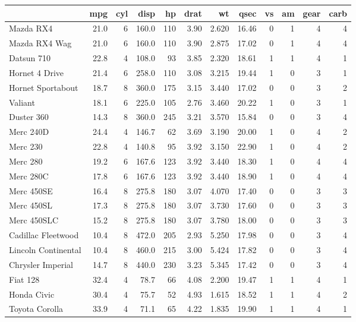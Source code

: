 \documentclass[
  letterpaper,
  DIV=11,
  numbers=noendperiod]{scrartcl}
\begin{document}
\begin{tabular}{l|r|r|r|r|r|r|r|r|r|r|r}
\hline
  & mpg & cyl & disp & hp & drat & wt & qsec & vs & am & gear & carb\\
\hline
Mazda RX4 & 21.0 & 6 & 160.0 & 110 & 3.90 & 2.620 & 16.46 & 0 & 1 & 4 & 4\\
\hline
Mazda RX4 Wag & 21.0 & 6 & 160.0 & 110 & 3.90 & 2.875 & 17.02 & 0 & 1 & 4 & 4\\
\hline
Datsun 710 & 22.8 & 4 & 108.0 & 93 & 3.85 & 2.320 & 18.61 & 1 & 1 & 4 & 1\\
\hline
Hornet 4 Drive & 21.4 & 6 & 258.0 & 110 & 3.08 & 3.215 & 19.44 & 1 & 0 & 3 & 1\\
\hline
Hornet Sportabout & 18.7 & 8 & 360.0 & 175 & 3.15 & 3.440 & 17.02 & 0 & 0 & 3 & 2\\
\hline
Valiant & 18.1 & 6 & 225.0 & 105 & 2.76 & 3.460 & 20.22 & 1 & 0 & 3 & 1\\
\hline
Duster 360 & 14.3 & 8 & 360.0 & 245 & 3.21 & 3.570 & 15.84 & 0 & 0 & 3 & 4\\
\hline
Merc 240D & 24.4 & 4 & 146.7 & 62 & 3.69 & 3.190 & 20.00 & 1 & 0 & 4 & 2\\
\hline
Merc 230 & 22.8 & 4 & 140.8 & 95 & 3.92 & 3.150 & 22.90 & 1 & 0 & 4 & 2\\
\hline
Merc 280 & 19.2 & 6 & 167.6 & 123 & 3.92 & 3.440 & 18.30 & 1 & 0 & 4 & 4\\
\hline
Merc 280C & 17.8 & 6 & 167.6 & 123 & 3.92 & 3.440 & 18.90 & 1 & 0 & 4 & 4\\
\hline
Merc 450SE & 16.4 & 8 & 275.8 & 180 & 3.07 & 4.070 & 17.40 & 0 & 0 & 3 & 3\\
\hline
Merc 450SL & 17.3 & 8 & 275.8 & 180 & 3.07 & 3.730 & 17.60 & 0 & 0 & 3 & 3\\
\hline
Merc 450SLC & 15.2 & 8 & 275.8 & 180 & 3.07 & 3.780 & 18.00 & 0 & 0 & 3 & 3\\
\hline
Cadillac Fleetwood & 10.4 & 8 & 472.0 & 205 & 2.93 & 5.250 & 17.98 & 0 & 0 & 3 & 4\\
\hline
Lincoln Continental & 10.4 & 8 & 460.0 & 215 & 3.00 & 5.424 & 17.82 & 0 & 0 & 3 & 4\\
\hline
Chrysler Imperial & 14.7 & 8 & 440.0 & 230 & 3.23 & 5.345 & 17.42 & 0 & 0 & 3 & 4\\
\hline
Fiat 128 & 32.4 & 4 & 78.7 & 66 & 4.08 & 2.200 & 19.47 & 1 & 1 & 4 & 1\\
\hline
Honda Civic & 30.4 & 4 & 75.7 & 52 & 4.93 & 1.615 & 18.52 & 1 & 1 & 4 & 2\\
\hline
Toyota Corolla & 33.9 & 4 & 71.1 & 65 & 4.22 & 1.835 & 19.90 & 1 & 1 & 4 & 1\\

\end{tabular}
\end{document}
